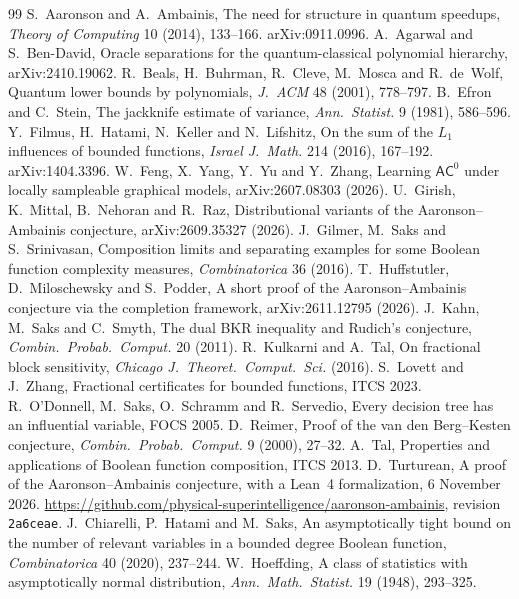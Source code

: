 \documentclass[11pt]{article}
\numberwithin{equation}{section}
\theoremstyle{definition}
\theoremstyle{remark}
\newcommand{\1}{\mathbf 1}
\begin{document}
\begin{thebibliography}{99}\small
{} S.~Aaronson and A.~Ambainis, The need for structure in quantum speedups, \emph{Theory of Computing} 10 (2014), 133--166. arXiv:0911.0996.
 A.~Agarwal and S.~Ben-David, Oracle separations for the quantum-classical polynomial hierarchy, arXiv:2410.19062.
 R.~Beals, H.~Buhrman, R.~Cleve, M.~Mosca and R.~de~Wolf, Quantum lower bounds by polynomials, \emph{J.~ACM} 48 (2001), 778--797.
 B.~Efron and C.~Stein, The jackknife estimate of variance, \emph{Ann.\ Statist.} 9 (1981), 586--596.
 Y.~Filmus, H.~Hatami, N.~Keller and N.~Lifshitz, On the sum of the $L_1$ influences of bounded functions, \emph{Israel J.\ Math.} 214 (2016), 167--192. arXiv:1404.3396.
 W.~Feng, X.~Yang, Y.~Yu and Y.~Zhang, Learning $\mathsf{AC}^0$ under locally sampleable graphical models, arXiv:2607.08303 (2026).
 U.~Girish, K.~Mittal, B.~Nehoran and R.~Raz, Distributional variants of the Aaronson--Ambainis conjecture, arXiv:2609.35327 (2026).
 J.~Gilmer, M.~Saks and S.~Srinivasan, Composition limits and separating examples for some Boolean function complexity measures, \emph{Combinatorica} 36 (2016).
 T.~Huffstutler, D.~Miloschewsky and S.~Podder, A short proof of the Aaronson--Ambainis conjecture via the completion framework, arXiv:2611.12795 (2026).
 J.~Kahn, M.~Saks and C.~Smyth, The dual BKR inequality and Rudich's conjecture, \emph{Combin.\ Probab.\ Comput.} 20 (2011).
 R.~Kulkarni and A.~Tal, On fractional block sensitivity, \emph{Chicago J.\ Theoret.\ Comput.\ Sci.} (2016).
 S.~Lovett and J.~Zhang, Fractional certificates for bounded functions, ITCS 2023.
 R.~O'Donnell, M.~Saks, O.~Schramm and R.~Servedio, Every decision tree has an influential variable, FOCS 2005.
 D.~Reimer, Proof of the van den Berg--Kesten conjecture, \emph{Combin.\ Probab.\ Comput.} 9 (2000), 27--32.
 A.~Tal, Properties and applications of Boolean function composition, ITCS 2013.
 D.~Turturean, A proof of the Aaronson--Ambainis conjecture, with a Lean~4 formalization, 6 November 2026. \url{https://github.com/physical-superintelligence/aaronson-ambainis}, revision \texttt{2a6ceae}.
 J.~Chiarelli, P.~Hatami and M.~Saks, An asymptotically tight bound on the number of relevant variables in a bounded degree Boolean function, \emph{Combinatorica} 40 (2020), 237--244.
 W.~Hoeffding, A class of statistics with asymptotically normal distribution, \emph{Ann.\ Math.\ Statist.} 19 (1948), 293--325.

\end{thebibliography}
\end{document}
